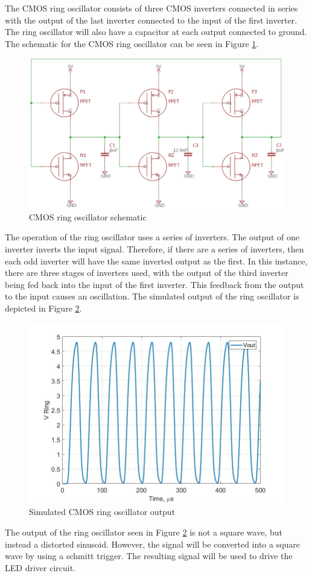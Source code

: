 
The CMOS ring oscillator consists of three CMOS inverters connected in series with the
output of the last inverter connected to the input of the first inverter. The ring oscillator will also have a
capacitor at each output connected to ground. The schematic for the CMOS ring oscillator can be seen in Figure \ref{fig:ringoscillatorcmosexp}.

\begin{figure}[H]
	\centering
	\includegraphics[width=0.5\linewidth]{CircuitDevelopment/RingOscillatorCMOSexp.png}
	\caption{CMOS ring oscillator schematic}
	\label{fig:ringoscillatorcmosexp}
\end{figure}


The operation of the ring oscillator uses a series of inverters. The output of one inverter inverts the input signal. Therefore, if there are a series of inverters, then each odd inverter will have the same inverted output as the first. In this instance, there are three stages of inverters used, with the output of the third inverter being fed back into the input of the first inverter. This feedback from the output to the input causes an oscillation. The simulated output of the ring oscillator is depicted in Figure \ref{fig:ringoscsimlab4}.

\begin{figure}[H]
	\centering
	\includegraphics[width=0.6\linewidth]{CircuitDevelopment/ringoscsimlab4.jpg}
	\caption{Simulated CMOS ring oscillator output}
	\label{fig:ringoscsimlab4}
\end{figure}

The output of the ring oscillator seen in Figure \ref{fig:ringoscsimlab4} is not a square wave, but instead a distorted sinusoid. However, the signal will be converted into a square wave by using a schmitt trigger. The resulting signal will be used to drive the LED driver circuit.
 



